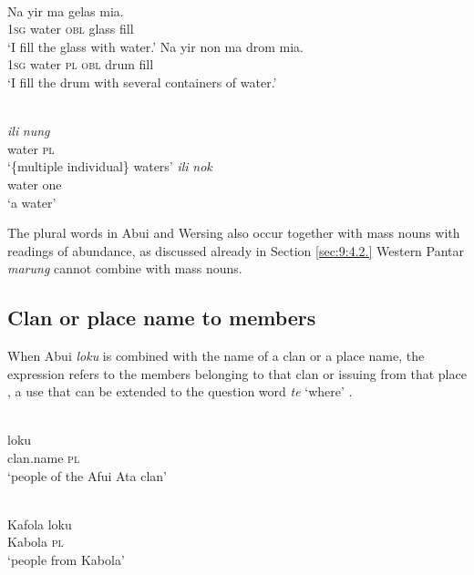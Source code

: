 \ea%
\label{ex:9:77}
 \\
\ea
\gll  Na yir ma gelas {mia}{{\textglotstop}}{.} \\
    \textsc{1sg} water \textsc{obl} glass fill \\
\glt `I fill the glass with water.'
\ex
\gll Na yir non ma drom {mia}{{\textglotstop}}{.} \\
   \textsc{1sg} water \textsc{pl} \textsc{obl} drum fill  \\
\glt  `I fill the drum with several containers of water.'
\z
\z







\ea%
\label{ex:9:78}
 \\
\ea
\gll\textit{ili} \textit{nung} \\
   water \textsc{pl} \\
 \glt `\{multiple individual\} waters' 
 \ex 
 \gll \textit{ili} \textit{nok}\\
  water one\\
\glt `a water'
\z
\z

The plural words in Abui and Wersing also occur together with mass nouns with readings of abundance, as discussed already in Section \ref{sec:9:4.2.} Western Pantar \textit{marung} cannot combine with mass nouns.

\subsection{Clan or place name to members}
When Abui \textit{loku} is combined with the name of a clan or a place name, the expression refers to the members belonging to that clan  or issuing from that place , a use that can be extended to the question word \textit{te} `where' .


\ea%
\label{ex:9:79}
 \\
 loku \\
   clan.name \textsc{pl}  \\
\glt `people of the Afui Ata clan'
\z







\ea%
\label{ex:9:80}
 \\
\gll  Kafola  loku \\
    Kabola  \textsc{pl} \\
\glt `people from Kabola'
\z








